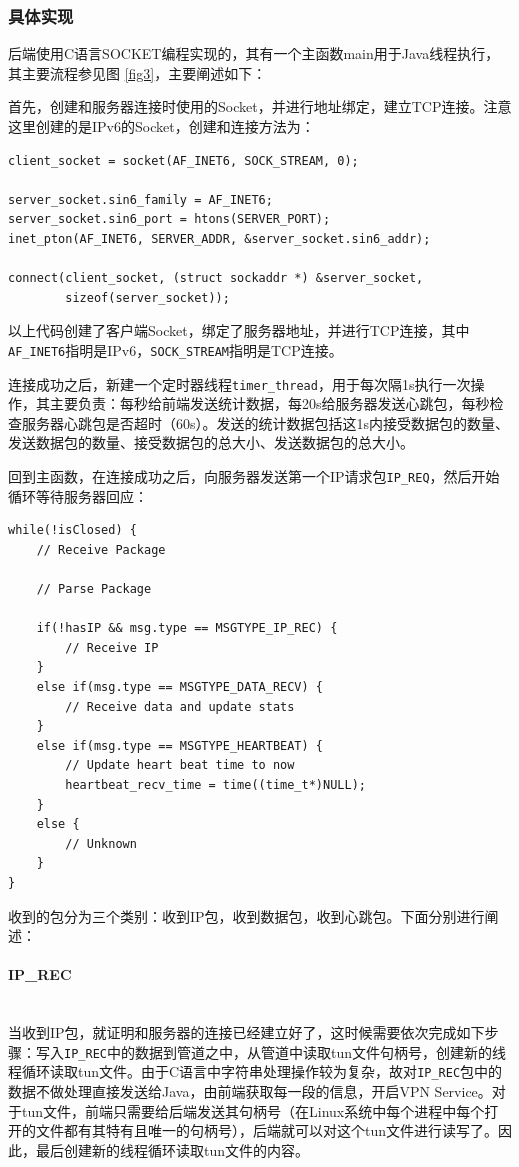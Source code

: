 \documentclass[paper=a4, fontsize=11pt, UTF8]{article} %
\numberwithin{equation}{section} %
\numberwithin{figure}{section} %
\numberwithin{table}{section} %
\begin{document}
\subsubsection{具体实现}


后端使用C语言SOCKET编程实现的，其有一个主函数main用于Java线程执行，其主要流程参见图 \ref{fig3}，主要阐述如下：

首先，创建和服务器连接时使用的Socket，并进行地址绑定，建立TCP连接。注意这里创建的是IPv6的Socket，创建和连接方法为：

\begin{verbatim}
client_socket = socket(AF_INET6, SOCK_STREAM, 0);

server_socket.sin6_family = AF_INET6;
server_socket.sin6_port = htons(SERVER_PORT);
inet_pton(AF_INET6, SERVER_ADDR, &server_socket.sin6_addr);

connect(client_socket, (struct sockaddr *) &server_socket,
        sizeof(server_socket));
\end{verbatim}

以上代码创建了客户端Socket，绑定了服务器地址，并进行TCP连接，其中\texttt{AF\_INET6}指明是IPv6，\texttt{SOCK\_STREAM}指明是TCP连接。

连接成功之后，新建一个定时器线程\texttt{timer\_thread}，用于每次隔1s执行一次操作，其主要负责：每秒给前端发送统计数据，每20s给服务器发送心跳包，每秒检查服务器心跳包是否超时（60s）。发送的统计数据包括这1s内接受数据包的数量、发送数据包的数量、接受数据包的总大小、发送数据包的总大小。

回到主函数，在连接成功之后，向服务器发送第一个IP请求包\texttt{IP\_REQ}，然后开始循环等待服务器回应：

\begin{verbatim}
while(!isClosed) {
	// Receive Package

	// Parse Package

	if(!hasIP && msg.type == MSGTYPE_IP_REC) {
		// Receive IP
	}
	else if(msg.type == MSGTYPE_DATA_RECV) {
		// Receive data and update stats
	}
	else if(msg.type == MSGTYPE_HEARTBEAT) {
		// Update heart beat time to now
		heartbeat_recv_time = time((time_t*)NULL);
	}
	else {
		// Unknown
	}
}
\end{verbatim}

收到的包分为三个类别：收到IP包，收到数据包，收到心跳包。下面分别进行阐述：
\paragraph{IP\_REC} \mbox{}\\
当收到IP包，就证明和服务器的连接已经建立好了，这时候需要依次完成如下步骤：写入\texttt{IP\_REC}中的数据到管道之中，从管道中读取tun文件句柄号，创建新的线程循环读取tun文件。由于C语言中字符串处理操作较为复杂，故对\texttt{IP\_REC}包中的数据不做处理直接发送给Java，由前端获取每一段的信息，开启VPN Service。对于tun文件，前端只需要给后端发送其句柄号（在Linux系统中每个进程中每个打开的文件都有其特有且唯一的句柄号），后端就可以对这个tun文件进行读写了。因此，最后创建新的线程循环读取tun文件的内容。
\end{document}
